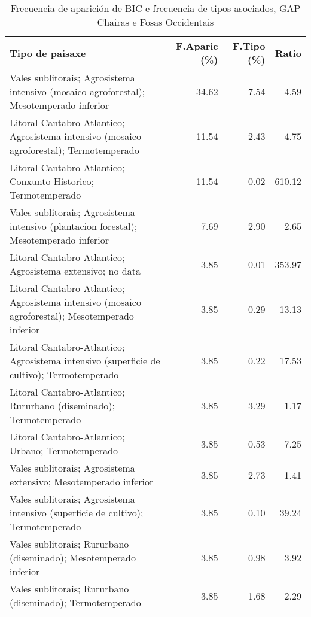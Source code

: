 \begin{table}[p]
\centering
\caption{Frecuencia de aparición de BIC e frecuencia de tipos asociados, GAP Chairas e Fosas Occidentais} 
\label{vbic11}
\begin{tabular}{lrrr}
  \hline
Tipo de paisaxe & F.Aparic (\%) & F.Tipo (\%) & Ratio \\ 
  \hline
Vales sublitorais; Agrosistema intensivo (mosaico agroforestal); Mesotemperado inferior & 34.62 & 7.54 & 4.59 \\ 
  Litoral Cantabro-Atlantico; Agrosistema intensivo (mosaico agroforestal); Termotemperado & 11.54 & 2.43 & 4.75 \\ 
  Litoral Cantabro-Atlantico; Conxunto Historico; Termotemperado & 11.54 & 0.02 & 610.12 \\ 
  Vales sublitorais; Agrosistema intensivo (plantacion forestal); Mesotemperado inferior & 7.69 & 2.90 & 2.65 \\ 
  Litoral Cantabro-Atlantico; Agrosistema extensivo; no data & 3.85 & 0.01 & 353.97 \\ 
  Litoral Cantabro-Atlantico; Agrosistema intensivo (mosaico agroforestal); Mesotemperado inferior & 3.85 & 0.29 & 13.13 \\ 
  Litoral Cantabro-Atlantico; Agrosistema intensivo (superficie de cultivo); Termotemperado & 3.85 & 0.22 & 17.53 \\ 
  Litoral Cantabro-Atlantico; Rururbano (diseminado); Termotemperado & 3.85 & 3.29 & 1.17 \\ 
  Litoral Cantabro-Atlantico; Urbano; Termotemperado & 3.85 & 0.53 & 7.25 \\ 
  Vales sublitorais; Agrosistema extensivo; Mesotemperado inferior & 3.85 & 2.73 & 1.41 \\ 
  Vales sublitorais; Agrosistema intensivo (superficie de cultivo); Termotemperado & 3.85 & 0.10 & 39.24 \\ 
  Vales sublitorais; Rururbano (diseminado); Mesotemperado inferior & 3.85 & 0.98 & 3.92 \\ 
  Vales sublitorais; Rururbano (diseminado); Termotemperado & 3.85 & 1.68 & 2.29 \\ 
   \hline
\end{tabular}
\end{table}
